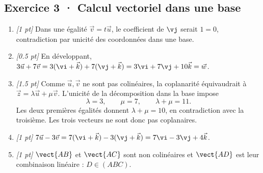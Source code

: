 \subsection*{Exercice 3 · Calcul vectoriel dans une base}\begin{enumerate}

\item \textit{[1 pt]} Dans une égalité $\vec v=t\vec u$, le coefficient de $\vj $ serait $1=0$, contradiction par unicité des coordonnées dans une base.

\item \textit{[\num{0,5} pt]} En développant, $3\vec u+7\vec v=3(\vi +\vec k)+7(\vj +\vec k)=3\vi +7\vj +10\vec k=\vec w$.

\item \textit{[\num{1,5} pt]} Comme $\vec u,\vec v$ ne sont pas colinéaires, la coplanarité équivaudrait à $\vec z=\lambda\vec u+\mu\vec v$. L'unicité de la décomposition dans la base impose
\[\lambda=3,\qquad\mu=7,\qquad\lambda+\mu=11.\]
Les deux premières égalités donnent $\lambda+\mu=10$, en contradiction avec la troisième. Les trois vecteurs ne sont donc pas coplanaires.

\item \textit{[1 pt]} $7\vec u-3\vec v=7(\vi +\vec k)-3(\vj +\vec k)=7\vi -3\vj +4\vec k$.

\item \textit{[1 pt]} $\vect{AB}$ et $\vect{AC}$ sont non colinéaires et $\vect{AD}$ est leur combinaison linéaire : $D\in(ABC)$.

\end{enumerate}


